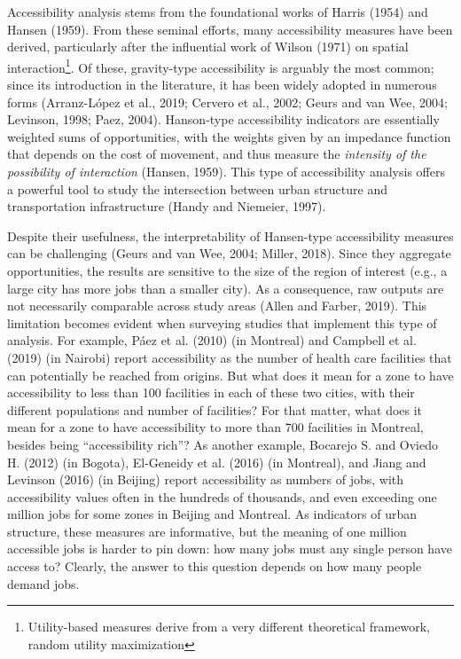 \documentclass[]{elsarticle} %
\begin{document}
Accessibility analysis stems from the foundational works of Harris
(1954) and Hansen (1959). From these seminal efforts, many accessibility
measures have been derived, particularly after the influential work of
Wilson (1971) on spatial interaction\footnote{Utility-based measures
  derive from a very different theoretical framework, random utility
  maximization}. Of these, gravity-type accessibility is arguably the
most common; since its introduction in the literature, it has been
widely adopted in numerous forms (Arranz-López et al., 2019; Cervero et
al., 2002; Geurs and van Wee, 2004; Levinson, 1998; Paez, 2004).
Hanson-type accessibility indicators are essentially weighted sums of
opportunities, with the weights given by an impedance function that
depends on the cost of movement, and thus measure the \emph{intensity of
the possibility of interaction} (Hansen, 1959). This type of
accessibility analysis offers a powerful tool to study the intersection
between urban structure and transportation infrastructure (Handy and
Niemeier, 1997).

Despite their usefulness, the interpretability of Hansen-type
accessibility measures can be challenging (Geurs and van Wee, 2004;
Miller, 2018). Since they aggregate opportunities, the results are
sensitive to the size of the region of interest (e.g., a large city has
more jobs than a smaller city). As a consequence, raw outputs are not
necessarily comparable across study areas (Allen and Farber, 2019). This
limitation becomes evident when surveying studies that implement this
type of analysis. For example, Páez et al. (2010) (in Montreal) and
Campbell et al. (2019) (in Nairobi) report accessibility as the number
of health care facilities that can potentially be reached from origins.
But what does it mean for a zone to have accessibility to less than 100
facilities in each of these two cities, with their different populations
and number of facilities? For that matter, what does it mean for a zone
to have accessibility to more than 700 facilities in Montreal, besides
being ``accessibility rich''? As another example, Bocarejo S. and Oviedo
H. (2012) (in Bogota), El-Geneidy et al. (2016) (in Montreal), and Jiang
and Levinson (2016) (in Beijing) report accessibility as numbers of
jobs, with accessibility values often in the hundreds of thousands, and
even exceeding one million jobs for some zones in Beijing and Montreal.
As indicators of urban structure, these measures are informative, but
the meaning of one million accessible jobs is harder to pin down: how
many jobs must any single person have access to? Clearly, the answer to
this question depends on how many people demand jobs.
\end{document}
